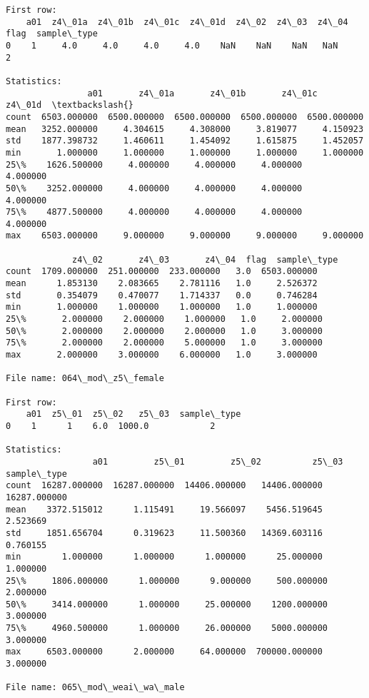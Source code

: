 \documentclass[11pt]{article}
\begin{document}
\begin{Verbatim}[commandchars=\\\{\}]
First row: 
    a01  z4\_01a  z4\_01b  z4\_01c  z4\_01d  z4\_02  z4\_03  z4\_04  flag  sample\_type
0    1     4.0     4.0     4.0     4.0    NaN    NaN    NaN   NaN            2

Statistics: 
                a01       z4\_01a       z4\_01b       z4\_01c       z4\_01d  \textbackslash{}
count  6503.000000  6500.000000  6500.000000  6500.000000  6500.000000   
mean   3252.000000     4.304615     4.308000     3.819077     4.150923   
std    1877.398732     1.460611     1.454092     1.615875     1.452057   
min       1.000000     1.000000     1.000000     1.000000     1.000000   
25\%    1626.500000     4.000000     4.000000     4.000000     4.000000   
50\%    3252.000000     4.000000     4.000000     4.000000     4.000000   
75\%    4877.500000     4.000000     4.000000     4.000000     4.000000   
max    6503.000000     9.000000     9.000000     9.000000     9.000000   

             z4\_02       z4\_03       z4\_04  flag  sample\_type  
count  1709.000000  251.000000  233.000000   3.0  6503.000000  
mean      1.853130    2.083665    2.781116   1.0     2.526372  
std       0.354079    0.470077    1.714337   0.0     0.746284  
min       1.000000    1.000000    1.000000   1.0     1.000000  
25\%       2.000000    2.000000    1.000000   1.0     2.000000  
50\%       2.000000    2.000000    2.000000   1.0     3.000000  
75\%       2.000000    2.000000    5.000000   1.0     3.000000  
max       2.000000    3.000000    6.000000   1.0     3.000000  

File name: 064\_mod\_z5\_female

First row: 
    a01  z5\_01  z5\_02   z5\_03  sample\_type
0    1      1    6.0  1000.0            2

Statistics: 
                 a01         z5\_01         z5\_02          z5\_03   sample\_type
count  16287.000000  16287.000000  14406.000000   14406.000000  16287.000000
mean    3372.515012      1.115491     19.566097    5456.519645      2.523669
std     1851.656704      0.319623     11.500360   14369.603116      0.760155
min        1.000000      1.000000      1.000000      25.000000      1.000000
25\%     1806.000000      1.000000      9.000000     500.000000      2.000000
50\%     3414.000000      1.000000     25.000000    1200.000000      3.000000
75\%     4960.500000      1.000000     26.000000    5000.000000      3.000000
max     6503.000000      2.000000     64.000000  700000.000000      3.000000

File name: 065\_mod\_weai\_wa\_male


\end{Verbatim}
\end{document}
